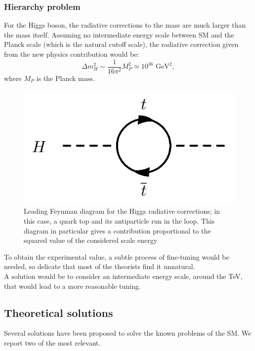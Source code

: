 \subsubsection{Hierarchy problem}
For the Higgs boson, the radiative corrections to the mass are much larger than the mass itself. Assuming no intermediate energy scale between SM and the Planck scale (which is the natural cutoff scale), the radiative correction given from the new physics contribution would be:
\begin{equation}
    \Delta m_H^2 \sim \frac{1}{16 \pi^2}M_P^2 \simeq 10^{36} \text{  GeV}^2, 
\end{equation}
where $M_P$ is the Planck mass.\\
\begin{figure}[ht]
    \centering
    \includegraphics[width= 0.5\linewidth]{images/radiative_corrections_H.png}
    \caption{Leading Feynman diagram for the Higgs radiative corrections; in this case, a quark top and its antiparticle run in the loop. This diagram in particular gives a contribution proportional to the squared value of the considered scale energy}
    \label{radiative_correction}
\end{figure}
To obtain the experimental value, a subtle process of fine-tuning would be needed, so delicate that most of the theorists find it unnatural.\\
A solution would be to consider an intermediate energy scale, around the TeV, that would lead to a more reasonable tuning.
\subsection{Theoretical solutions}
Several solutions have been proposed to solve the known problems of the SM. We report two of the most relevant.\\
